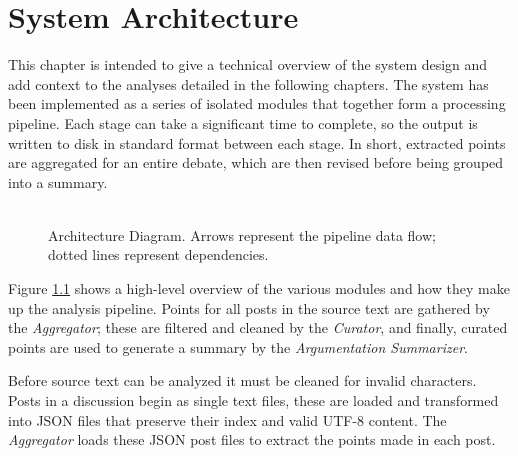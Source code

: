 \chapter{System Architecture\label{chap:system-architecture}}
  This chapter is intended to give a technical overview of the system design and add context to the analyses detailed in the following chapters. The system has been implemented as a series of isolated modules that together form a processing pipeline. Each stage can take a significant time to complete, so the output is written to disk in standard format between each stage. In short, extracted points are aggregated for an entire debate, which are then revised before being grouped into a summary.

  \begin{figure}[!h]
    \centering
    \caption{\\Architecture Diagram. Arrows represent the pipeline data flow; dotted lines represent dependencies.}
    \label{fig:arch-dia}
  \end{figure}

  Figure \ref{fig:arch-dia} shows a high-level overview of the various modules and how they make up the analysis pipeline. Points for all posts in the source text are gathered by the \textit{Aggregator}; these are filtered and cleaned by the \textit{Curator}, and finally, curated points are used to generate a summary by the \textit{Argumentation Summarizer}.

  Before source text can be analyzed it must be cleaned for invalid characters. Posts in a discussion begin as single text files, these are loaded and transformed into JSON files that preserve their index and valid UTF-8 content. The \textit{Aggregator} loads these JSON post files to extract the points made in each post.

